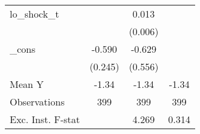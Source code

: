 {\begin{tabular}{l*{3}{c}}
\addlinespace
lo\_shock\_t  &                     &       0.013\sym{**} &                     \\
            &                     &     (0.006)         &                     \\
\addlinespace
\_cons      &      -0.590\sym{**} &      -0.629         &                     \\
            &     (0.245)         &     (0.556)         &                     \\
\midrule
Mean Y      &       -1.34         &       -1.34         &       -1.34         \\
Observations&         399         &         399         &         399         \\
Exc. Inst. F-stat&                     &       4.269         &       0.314         \\
\bottomrule
\end{tabular}
}
